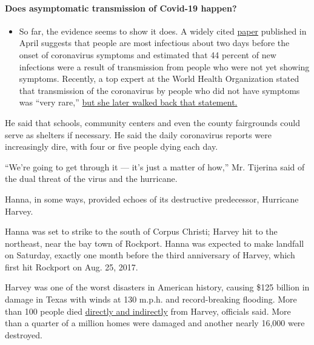 \begin{itemize}
{  \paragraph{Does asymptomatic transmission of Covid-19
  happen?}\label{does-asymptomatic-transmission-of-covid-19-happen}}

  \begin{itemize}
  \tightlist
  \item
    So far, the evidence seems to show it does. A widely cited
    \href{https://www.nature.com/articles/s41591-020-0869-5}{paper}
    published in April suggests that people are most infectious about
    two days before the onset of coronavirus symptoms and estimated that
    44 percent of new infections were a result of transmission from
    people who were not yet showing symptoms. Recently, a top expert at
    the World Health Organization stated that transmission of the
    coronavirus by people who did not have symptoms was ``very rare,''
    \href{https://www.nytimes.com/2020/06/09/world/coronavirus-updates.html?action=click\&pgtype=Article\&state=default\&region=MAIN_CONTENT_3\&context=storylines_faq\#link-1f302e21}{but
    she later walked back that statement.}
  \end{itemize}
\end{itemize}

He said that schools, community centers and even the county fairgrounds
could serve as shelters if necessary. He said the daily coronavirus
reports were increasingly dire, with four or five people dying each day.

``We're going to get through it --- it's just a matter of how,'' Mr.
Tijerina said of the dual threat of the virus and the hurricane.

Hanna, in some ways, provided echoes of its destructive predecessor,
Hurricane Harvey.

Hanna was set to strike to the south of Corpus Christi; Harvey hit to
the northeast, near the bay town of Rockport. Hanna was expected to make
landfall on Saturday, exactly one month before the third anniversary of
Harvey, which first hit Rockport on Aug. 25, 2017.

Harvey was one of the worst disasters in American history, causing \$125
billion in damage in Texas with winds at 130 m.p.h. and record-breaking
flooding. More than 100 people died
\href{https://www.nhc.noaa.gov/data/tcr/AL092017_Harvey.pdf}{directly
and indirectly} from Harvey, officials said. More than a quarter of a
million homes were damaged and another nearly 16,000 were destroyed.

